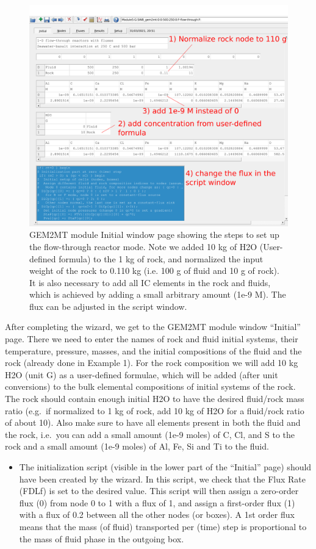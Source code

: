 \documentclass[
]{book}
\providecommand{\tightlist}{%
  \setlength{\itemsep}{0pt}\setlength{\parskip}{0pt}}
\begin{document}
\begin{figure}
\includegraphics[width=0.9\linewidth]{figures/module5/fig-4} \caption{GEM2MT module Initial window page showing the steps to set up the flow-through reactor mode. Note we added 10 kg of H2O (User-defined formula) to the 1 kg of rock, and normalized the input weight of the rock to 0.110 kg (i.e. 100 g of fluid and 10 g of rock). It is also necessary to add all IC elements in the rock and fluids, which is achieved by adding a small arbitrary amount (1e-9 M). The flux can be adjusted in the script window.}\label{fig:fig-4e}
\end{figure}

After completing the wizard, we get to the GEM2MT module window ``Initial'' page. There we need to enter the names of rock and fluid initial systems, their temperature, pressure, masses, and the initial compositions of the fluid and the rock (already done in Example 1). For the rock composition we will add 10 kg H2O (unit G) as a user-defined formulae, which will be added (after unit conversions) to the bulk elemental compositions of initial systems of the rock. The rock should contain enough initial H2O to have the desired fluid/rock mass ratio (e.g.~if normalized to 1 kg of rock, add 10 kg of H2O for a fluid/rock ratio of about 10). Also make sure to have all elements present in both the fluid and the rock, i.e.~you can add a small amount (1e-9 moles) of C, Cl, and S to the rock and a small amount (1e-9 moles) of Al, Fe, Si and Ti to the fluid.

\begin{itemize}
\tightlist
\item
  The initialization script (visible in the lower part of the ``Initial'' page) should have been created by the wizard. In this script, we check that the Flux Rate (FDLf) is set to the desired value. This script will then assign a zero-order flux (0) from node 0 to 1 with a flux of 1, and assign a first-order flux (1) with a flux of 0.2 between all the other nodes (or boxes). A 1st order flux means that the mass (of fluid) transported per (time) step is proportional to the mass of fluid phase in the outgoing box.
\end{itemize}
\end{document}
